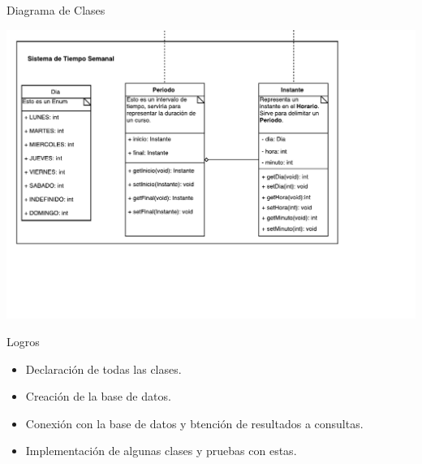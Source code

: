 \begin{frame}{Diagrama de Clases}
\begin{center}
    \includegraphics[width=\textwidth]{diagramaClases3}
\end{center}
\end{frame}

\begin{frame}{Logros}
    \begin{itemize}
         \item Declaración de todas las clases.
         \item Creación de la base de datos.
         \item Conexión con la base de datos y btención de resultados a
            consultas.
        \item Implementación de algunas clases y pruebas con estas.
    \end{itemize}
\end{frame}
